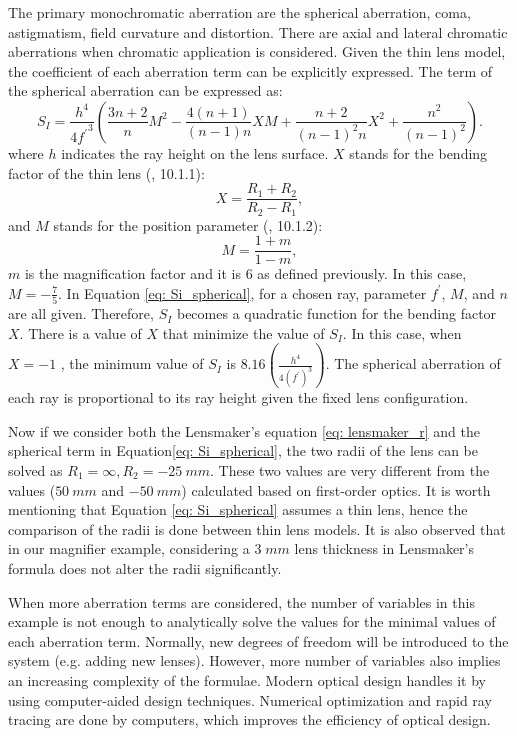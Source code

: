 The primary monochromatic aberration are the spherical aberration, coma, astigmatism, field curvature and distortion. There are axial and lateral chromatic aberrations when chromatic application is considered. Given the thin lens model, the coefficient of each aberration term can be explicitly expressed. The term of the spherical aberration can be expressed as:
\begin{equation} \label{eq: Si_spherical}
    S_I = \frac{h^4}{4{f^\prime}^3}\left(\frac{3n+2}{n}M^2 - \frac{4(n+1)}{(n-1)n}XM + \frac{n+2}{(n-1)^2n}X^2 + \frac{n^2}{(n-1)^2}\right).
\end{equation}                            %
where $h$ indicates the ray height on the lens surface. $X$ stands for the bending factor of the thin lens (\cite{GrossHBOvol1}, 10.1.1):
\begin{equation} \label{eqn: bending factor}
X = \frac{R_1+R_2}{R_2-R_1},
\end{equation}and $M$ stands for the position parameter (\cite{GrossHBOvol1}, 10.1.2):
\begin{equation} \label{eqn: position parameter}
M = \frac{1+m}{1-m},
\end{equation}$m$ is the magnification factor and it is $6$ as defined previously. In this case, $M=-\frac{7}{5}$. In Equation \ref{eq: Si_spherical}, for a chosen ray, parameter $f^\prime$, $M$, and $n$ are all given. Therefore, $S_I$ becomes a quadratic function for the bending factor $X$. There is a value of $X$ that minimize the value of $S_I$. In this case, when $X = -1$ , the minimum value of $S_I $ is $ 8.16(\frac{h^4}{4(f^\prime)^3})$. The spherical aberration of each ray is proportional to its ray height given the fixed lens configuration. 

Now if we consider both the Lensmaker's equation \ref{eq: lensmaker_r} and the spherical term in Equation\ref{eq: Si_spherical}, the two radii of the lens can be solved as $R_1 = \infty, R_2 = -25\ mm$. These two values are very different from the values ($50 \ mm$ and $-50 \ mm$) calculated based on first-order optics. It is worth mentioning that Equation \ref{eq: Si_spherical} assumes a thin lens, hence the comparison of the radii is done between thin lens models. It is also observed that in our magnifier example, considering a $3 \;mm$ lens thickness in Lensmaker's formula does not alter the radii significantly.  

When more aberration terms are considered, the number of variables in this example is not enough to analytically solve the values for the minimal values of each aberration term. Normally, new degrees of freedom will be introduced to the system (e.g. adding new lenses). However, more number of variables also implies an increasing complexity of the formulae. Modern optical design handles it by using computer-aided design techniques. Numerical optimization and rapid ray tracing are done by computers, which improves the efficiency of optical design.  


